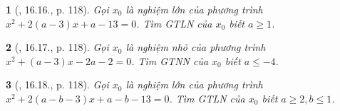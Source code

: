 \documentclass{article}
\newtheorem{baitoan}{}
\begin{document}
\begin{baitoan}[\cite{TLCT_THCS_Toan_9_dai_so}, 16.16., p. 118]
	Gọi $x_0$ là nghiệm lớn của phương trình $x^2 + 2(a - 3)x + a - 13 = 0$. Tìm {\rm GTLN} của $x_0$ biết $a\ge1$.
\end{baitoan}

\begin{baitoan}[\cite{TLCT_THCS_Toan_9_dai_so}, 16.17., p. 118]
	Gọi $x_0$ là nghiệm nhỏ của phương trình $x^2 + (a - 3)x - 2a - 2 = 0$. Tìm {\rm GTNN} của $x_0$ biết $a\le-4$.
\end{baitoan}

\begin{baitoan}[\cite{TLCT_THCS_Toan_9_dai_so}, 16.18., p. 118]
	Gọi $x_0$ là nghiệm lớn của phương trình $x^2 + 2(a - b - 3)x + a - b - 13 = 0$. Tìm {\rm GTLN} của $x_0$ biết $a\ge2,b\le1$.
\end{baitoan}


\printbibliography[heading=bibintoc]
	
\end{document}

